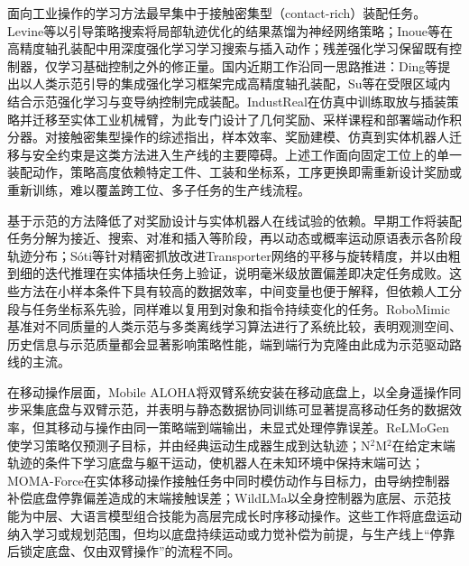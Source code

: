 面向工业操作的学习方法最早集中于接触密集型（contact-rich）装配任务。Levine等以引导策略搜索将局部轨迹优化的结果蒸馏为神经网络策略\cite{levine2015gps}；Inoue等在高精度轴孔装配中用深度强化学习学习搜索与插入动作\cite{inoue2017assembly}；残差强化学习保留既有控制器，仅学习基础控制之外的修正量\cite{johannink2019residual}。国内近期工作沿同一思路推进：Ding等提出以人类示范引导的集成强化学习框架完成高精度轴孔装配\cite{ding2026ensemble}，Su等在受限区域内结合示范强化学习与变导纳控制完成装配\cite{su2026admittance}。IndustReal在仿真中训练取放与插装策略并迁移至实体工业机械臂，为此专门设计了几何奖励、采样课程和部署端动作积分器\cite{tang2023industreal}。对接触密集型操作的综述指出，样本效率、奖励建模、仿真到实体机器人迁移与安全约束是这类方法进入生产线的主要障碍\cite{elguea2023review}。上述工作面向固定工位上的单一装配动作，策略高度依赖特定工件、工装和坐标系，工序更换即需重新设计奖励或重新训练，难以覆盖跨工位、多子任务的生产线流程。

基于示范的方法降低了对奖励设计与实体机器人在线试验的依赖。早期工作将装配任务分解为接近、搜索、对准和插入等阶段，再以动态或概率运动原语表示各阶段轨迹分布\cite{yang2019adaptive,qin2019precision,zang2023promp}；Sóti等针对精密抓放改进Transporter网络的平移与旋转精度，并以由粗到细的迭代推理在实体插块任务上验证，说明毫米级放置偏差即决定任务成败\cite{soti2023precisepick}。这些方法在小样本条件下具有较高的数据效率，中间变量也便于解释，但依赖人工分段与任务坐标系先验，同样难以复用到对象和指令持续变化的任务。RoboMimic基准对不同质量的人类示范与多类离线学习算法进行了系统比较，表明观测空间、历史信息与示范质量都会显著影响策略性能\cite{mandlekar2022robomimic}，端到端行为克隆由此成为示范驱动路线的主流。

在移动操作层面，Mobile ALOHA将双臂系统安装在移动底盘上，以全身遥操作同步采集底盘与双臂示范，并表明与静态数据协同训练可显著提高移动任务的数据效率，但其移动与操作由同一策略端到端输出，未显式处理停靠误差\cite{fu2024mobilealoha}。ReLMoGen使学习策略仅预测子目标，并由经典运动生成器生成到达轨迹\cite{xia2021relmogen}；N\(^2\)M\(^2\)在给定末端轨迹的条件下学习底盘与躯干运动，使机器人在未知环境中保持末端可达\cite{honerkamp2023n2m2}；MOMA-Force在实体移动操作接触任务中同时模仿动作与目标力，由导纳控制器补偿底盘停靠偏差造成的末端接触误差\cite{yang2023momaforce}；WildLMa以全身控制器为底层、示范技能为中层、大语言模型组合技能为高层完成长时序移动操作\cite{qiu2025wildlma}。这些工作将底盘运动纳入学习或规划范围，但均以底盘持续运动或力觉补偿为前提，与生产线上“停靠后锁定底盘、仅由双臂操作”的流程不同。

